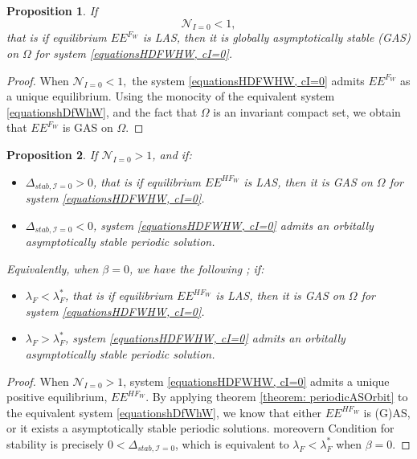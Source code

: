 \documentclass{article}
\newcommand{\lfw}{\lambda_{F}}
\newcommand{\lfw}{\lambda_{F}}
\newcommand{\cI}{\mathcal{I}}
\newtheorem{prop}{Proposition}
\begin{document}
\begin{prop}\label{propEEFGAS}If 
$$
\mathcal{N}_{I =0} < 1,
$$
that is if equilibrium $EE^{F_W}$ is LAS, then it is globally asymptotically stable (GAS) on $\Omega$ for system \eqref{equationsHDFWHW, cI=0}.
\end{prop}

\begin{proof}
When $\mathcal{N}_{I =0} < 1,$ the system \eqref{equationsHDFWHW, cI=0} admits $EE^{F_W}$ as a unique equilibrium. Using the monocity of the equivalent system \eqref{equationshDfWhW}, and the fact that $\Omega$ is an invariant compact set, we obtain that $EE^{F_W}$ is GAS on $\Omega$.
\end{proof}


\begin{prop}\label{LimitCycle, cI=0}
If $\mathcal{N}_{I =0} > 1$, and if:
\begin{itemize}
\item $\Delta_{stab, \cI =0} > 0$, that is if equilibrium $EE^{HF_W}$ is LAS, then it is GAS on $\Omega$ for system \eqref{equationsHDFWHW, cI=0}.
\item $\Delta_{stab, \cI =0} < 0$, system \eqref{equationsHDFWHW, cI=0} admits an orbitally asymptotically stable periodic solution.
\end{itemize}

Equivalently, when $\beta = 0$, we have the following ; if:
\begin{itemize}
\item $\lfw <  \lfw^*$, that is if equilibrium $EE^{HF_W}$ is LAS, then it is GAS on $\Omega$ for system \eqref{equationsHDFWHW, cI=0}.
\item $\lfw  > \lfw^*$, system \eqref{equationsHDFWHW, cI=0} admits an orbitally asymptotically stable periodic solution.
\end{itemize}
\end{prop}

\begin{proof}
When $\mathcal{N}_{I =0} > 1$, system \eqref{equationsHDFWHW, cI=0} admits a unique positive equilibrium, $EE^{HF_W}$.  
By applying theorem \ref{theorem: periodicASOrbit} to the equivalent system \eqref{equationshDfWhW}, we know that either $EE^{HF_W}$ is (G)AS, or it exists a asymptotically stable periodic solutions. moreovern Condition for stability is precisely $0 < \Delta_{stab, \cI =0}$, which is equivalent to $\lfw < \lfw^*$ when $\beta = 0$.
\end{proof} 
\end{document}
